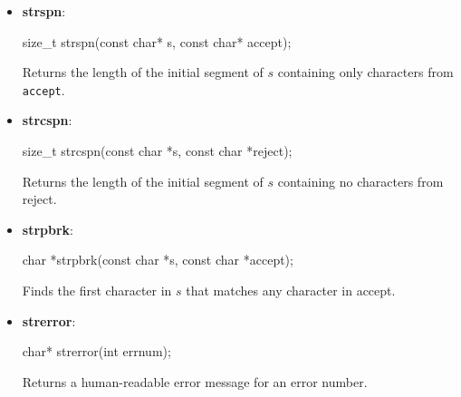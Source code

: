 \documentclass{report}
\begin{document}
\begin{itemize}
\begin{cppcode}
                // red\0green\0blue\0
            \end{cppcode}
        \item \textbf{strspn}: 
            \bigbreak \noindent 
            \begin{cppcode}
            size_t strspn(const char* s, const char* accept);
            \end{cppcode}
            \bigbreak \noindent 
            Returns the length of the initial segment of $s$ containing only characters from \texttt{accept}.
        \item \textbf{strcspn}: 
            \bigbreak \noindent 
            \begin{cppcode}
            size_t strcspn(const char *s, const char *reject);
            \end{cppcode}
            \bigbreak \noindent 
            Returns the length of the initial segment of $s$ containing no characters from reject.
        \item \textbf{strpbrk}:
            \bigbreak \noindent 
            \begin{cppcode}
            char *strpbrk(const char *s, const char *accept);
            \end{cppcode}
            \bigbreak \noindent 
            Finds the first character in $s$ that matches any character in accept.
        \item \textbf{strerror}: 
            \bigbreak \noindent 
            \begin{cppcode}
            char* strerror(int errnum);
            \end{cppcode}
            \bigbreak \noindent 
            Returns a human-readable error message for an error number.


    \end{itemize}

    \pagebreak 
\end{document}
